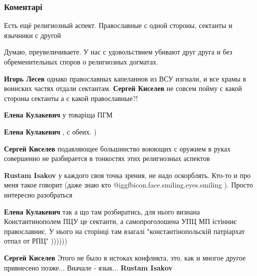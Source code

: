 
 
 
 
 
\subsubsection{Коментарі}
\label{sec:04_05_2019.fb.lesev_igor.1.kolomojskij_slova_civil_war.cmt}

\begin{itemize} %
Есть ещё религиозный аспект. Православные с одной стороны, сектанты и язычники с другой

\begin{itemize} %
Думаю, преувеличиваете. У нас с удовольствием убивают друг друга и без обременительных споров о религиозных догматах.

\textbf{Игорь Лесев} однако православных капеланнов из ВСУ изгнали, и все храмы в воинских частях отдали сектантам.
\textbf{Сергей Киселев} не совсем пойму с какой стороны сектанты а с какой православные?!

\textbf{Елена Кулакевич} у товаріща ПГМ

\textbf{Елена Кулакевич} , с обеих. )

\textbf{Сергей Киселев} подавляющее большинство воюющих с оружием в руках совершенно не разбирается в тонкостях этих религиозных аспектов

\textbf{Rustam Isakov} у каждого своя точка зрения, не надо оскорблять. Кто-то и про меня такое говорит (даже знаю кто  @igg{fbicon.face.smiling.eyes.smiling} ). Просто интересно разобраться

\textbf{Елена Кулакевич} так а що там розбиратись, для нього визнана Константинополем ПЦУ це сектанти, а самопроголошена УПЦ МП істінниє православниє. У нього на сторінці там взагалі "константінопольскій патріархат отпал от РПЦ" ))))))

\textbf{Сергей Киселев}
Этого не было в истоках конфликта, это, как и многое другое привнесено позже... Вначале - язык...
\textbf{Rustam Isakov} 


\end{itemize}
\end{itemize}
